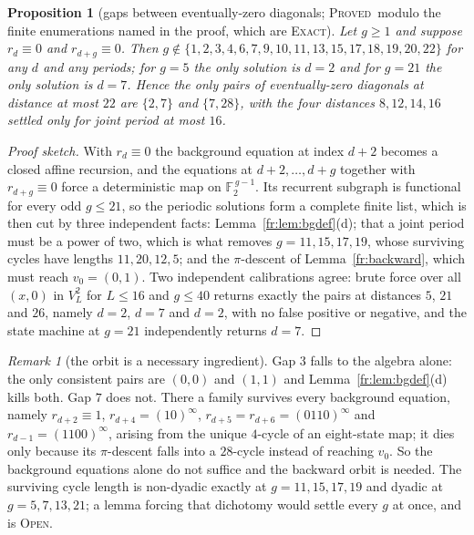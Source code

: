 \documentclass[11pt]{article}
\newtheorem{proposition}[theorem]{Proposition}
\theoremstyle{definition}
\theoremstyle{remark}
\newtheorem{remark}[theorem]{Remark}
\newcommand{\PROVED}{\textsc{Proved}}
\newcommand{\EXACT}{\textsc{Exact}}
\newcommand{\OPEN}{\textsc{Open}}
\begin{document}
\begin{proposition}[gaps between eventually-zero diagonals; \PROVED\ modulo the finite enumerations named in the proof, which are \EXACT]\label{fr:gaps}
Let $g\ge1$ and suppose $r_d\equiv0$ and $r_{d+g}\equiv0$. Then $g\notin\{1,2,3,4,6,7,9,10,11,13,15,17,18,19,20,22\}$ for any
$d$ and any periods; for $g=5$ the only solution is $d=2$ and for $g=21$ the only solution is $d=7$. Hence the only pairs of
eventually-zero diagonals at distance at most $22$ are $\{2,7\}$ and $\{7,28\}$, with the four distances $8,12,14,16$ settled
only for joint period at most $16$.
\end{proposition}
\begin{proof}[Proof sketch]
With $r_d\equiv0$ the background equation at index $d+2$ becomes a closed affine recursion, and the equations at
$d+2,\dots,d+g$ together with $r_{d+g}\equiv0$ force a deterministic map on $\mathbb F_2^{\,g-1}$. Its recurrent subgraph is
functional for every odd $g\le21$, so the periodic solutions form a complete finite list, which is then cut by three
independent facts: Lemma~\ref{fr:lem:bgdef}(d); that a joint period must be a power of two, which is what removes
$g=11,15,17,19$, whose surviving cycles have lengths $11,20,12,5$; and the $\pi$-descent of Lemma~\ref{fr:backward}, which
must reach $v_0=(0,1)$. Two independent calibrations agree: brute force over all $(x,0)$ in $V_L^2$ for $L\le16$ and $g\le40$
returns exactly the pairs at distances $5$, $21$ and $26$, namely $d=2$, $d=7$ and $d=2$, with no false positive or negative,
and the state machine at $g=21$ independently returns $d=7$.
\end{proof}

\begin{remark}[the orbit is a necessary ingredient]\label{fr:gaps:orbit}
Gap $3$ falls to the algebra alone: the only consistent pairs are $(0,0)$ and $(1,1)$ and Lemma~\ref{fr:lem:bgdef}(d) kills
both. Gap $7$ does not. There a family survives every background equation, namely $r_{d+2}\equiv1$, $r_{d+4}=(10)^\infty$,
$r_{d+5}=r_{d+6}=(0110)^\infty$ and $r_{d-1}=(1100)^\infty$, arising from the unique $4$-cycle of an eight-state map; it dies
only because its $\pi$-descent falls into a $28$-cycle instead of reaching $v_0$. So the background equations alone do not
suffice and the backward orbit is needed. The surviving cycle length is non-dyadic exactly at $g=11,15,17,19$ and dyadic at
$g=5,7,13,21$; a lemma forcing that dichotomy would settle every $g$ at once, and is \OPEN.
\end{remark}
\end{document}
